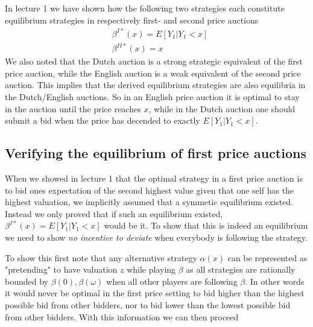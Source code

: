
In lecture 1 we have shown how the following two strategies each constitute equilibrium strategies in respectively first- and second price auctions
\begin{equation}
  \begin{split}
    &\beta^{I*}(x) = E[Y_1 | Y_1 < x] \\
    &\beta^{II*}(x) = x
  \end{split}
\end{equation}
We also noted that the Dutch auction is a strong strategic equivalent of the first price auction, while the English auction is a weak equivalent of the second price auction. This implies that the derived equilibrium strategies are also equilibria in the Dutch/English auctions. So in an English price auction it is optimal to stay in the auction until the price reaches $x$, while in the Dutch auction one should submit a bid when the price has decended to exactly $E[Y_1 | Y_1 < x]$.

\subsection{Verifying the equilibrium of first price auctions}
When we showed in lecture 1 that the optimal strategy in a first price auction is to bid ones expectation of the second highest value given that one self has the highest valuation, we implicitly assumed that a symmetic equilibrium existed. Instead we only proved that if such an equilibrium existed, $\beta^{I*}(x)= E[Y_1|Y_1 < x]$ would be it. To show that this is indeed an equilibrium we need to show \textit{no incentive to deviate} when everybody is following the strategy.

To show this first note that any alternative strategy $\alpha(x)$ can be represented as "pretending" to have valuation $z$ while playing $\beta$ as all strategies are rationally bounded by $\beta(0), \beta(\omega)$ when all other players are following $\beta$. In other words it would never be optimal in the first price setting to bid higher than the highest possible bid from other bidders, nor to bid lower than the lowest possible bid from other bidders. With this information we can then proceed

